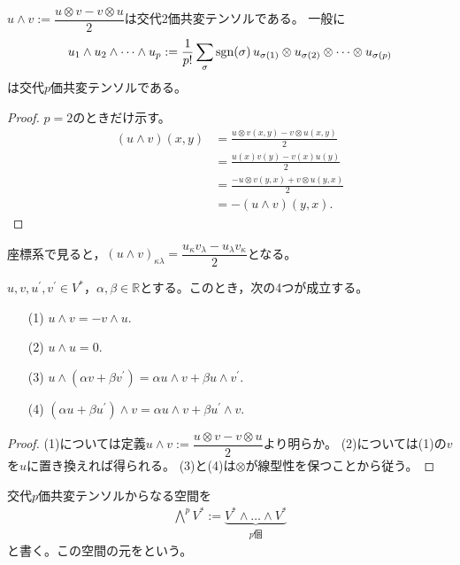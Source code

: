 \documentclass[uplatex]{jsarticle}
\begin{document}
\begin{hodai}
  $u \wedge v := \dfrac{u \otimes v - v \otimes u}{2}$は交代2価共変テンソルである。
  一般に
  \begin{align}
    u_{1} \wedge u_{2} \wedge \cdots \wedge u_p := \dfrac{1}{p!} \sum_{\sigma} \operatorname{sgn} (\sigma) \, u_{\sigma(1)} \otimes u_{\sigma(2)} \otimes \cdots \otimes u_{\sigma(p)}
  \end{align}
  は交代$p$価共変テンソルである。
\end{hodai}
\begin{proof}
  $p = 2$のときだけ示す。
  \begin{align*}
    (u \wedge v)(x,y) &= \frac{u \otimes v (x,y) - v \otimes u (x,y)}{2} \\
    &= \frac{u(x)v(y) - v(x)u(y)}{2} \\
    &= \frac{-u \otimes v (y,x) + v \otimes u (y,x)}{2} \\
    &= - (u \wedge v)(y,x).
  \end{align*}
\end{proof}

座標系で見ると，$(u \wedge v)_{\kappa\lambda} = \dfrac{u_{\kappa}v_{\lambda} - u_{\lambda}v_{\kappa}}{2}$となる。

\begin{hodai}
  $u,v,u^{\prime}, v^{\prime} \in V^{*}$，$\alpha, \beta \in \mathbb{R}$とする。このとき，次の4つが成立する。
  \begin{enumerate}
    \item[(1)] $u \wedge v = - v \wedge u$.
    \item[(2)] $u \wedge u = 0$.
    \item[(3)] $u \wedge (\alpha v + \beta v^{\prime}) = \alpha u \wedge v + \beta u \wedge v^{\prime}$.
    \item[(4)] $(\alpha u + \beta u^{\prime}) \wedge v = \alpha u \wedge v + \beta u^{\prime} \wedge v$.   
  \end{enumerate}
\end{hodai}
\begin{proof}
  (1)については定義$u \wedge v := \dfrac{u \otimes v - v \otimes u}{2}$より明らか。
  (2)については(1)の$v$を$u$に置き換えれば得られる。
  (3)と(4)は$\otimes$が線型性を保つことから従う。
\end{proof}

\begin{teigi}[外冪]
  交代$p$価共変テンソルからなる空間を
  \begin{align}
    \bigwedge^{p} V^{*} := \underbrace{V^{*} \wedge \dots \wedge V^{*}}_{p\text{個}}
  \end{align}
  と書く。この空間の元をという。
\end{teigi}
\end{document}
